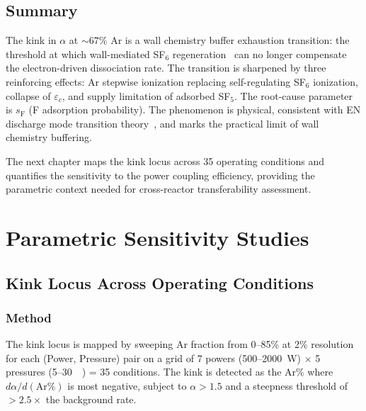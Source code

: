 \documentclass[11pt,a4paper]{report}
\begin{document}
\section{Summary}
\label{sec:kink_summary}

The kink in $\alpha$ at ${\sim}67\%$ Ar is a wall chemistry buffer exhaustion transition: the threshold at which wall-mediated SF$_6$ regeneration~\cite{Kokkoris2009} can no longer compensate the electron-driven dissociation rate.  The transition is sharpened by three reinforcing effects: Ar stepwise ionization replacing self-regulating SF$_6$ ionization, collapse of $\varepsilon_c$, and supply limitation of adsorbed SF$_5$.  The root-cause parameter is $s_\mathrm{F}$ (F adsorption probability).  The phenomenon is physical, consistent with EN discharge mode transition theory~\cite{Lichtenberg1997,Gudmundsson2002}, and marks the practical limit of wall chemistry buffering.

The next chapter maps the kink locus across 35 operating conditions and quantifies the sensitivity to the power coupling efficiency, providing the parametric context needed for cross-reactor transferability assessment.


\chapter{Parametric Sensitivity Studies}
\label{ch:sensitivity}

\section{Kink Locus Across Operating Conditions}
\label{sec:sens_locus}

\subsection{Method}
\label{sec:sens_method}

The kink locus is mapped by sweeping Ar fraction from 0--85\% at 2\% resolution for each (Power, Pressure) pair on a grid of 7 powers (500--\SI{2000}{\watt}) $\times$ 5 pressures (5--\SI{30}{\milli\torr}) = 35 conditions.  The kink is detected as the Ar\% where $d\alpha/d(\mathrm{Ar\%})$ is most negative, subject to $\alpha > 1.5$ and a steepness threshold of $>2.5\times$ the background rate.
\end{document}
